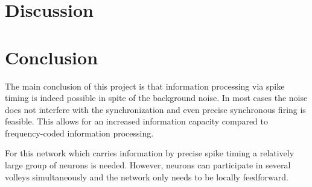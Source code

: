\documentclass[12pt,a4paper, bibliography=totoc, listof=numbered, footexclude, BCOR=8.25mm, twoside]{scrartcl}
\begin{document}
  \section{Discussion}
         
  \section{Conclusion}
  
  The main conclusion of this project is that information processing via spike timing is indeed possible in spite of the background noise. In most cases the noise does not interfere with the synchronization and even precise synchronous firing is feasible. This allows for an increased information capacity compared to frequency-coded information processing.
  
  For this network which carries information by precise spike timing a relatively large group of neurons is needed. However, neurons can participate in several volleys simultaneously and the network only needs to be locally feedforward.
 
\end{document}
